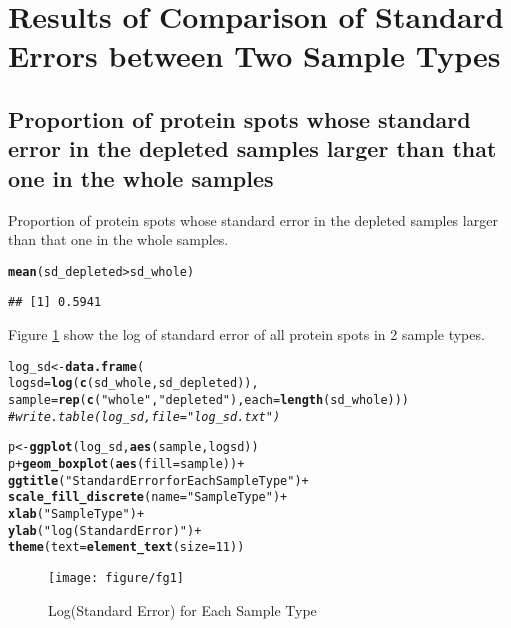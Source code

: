 \documentclass{article}\usepackage[]{graphicx}\usepackage[]{color}
\makeatletter
\def\maxwidth{ %
  \ifdim\Gin@nat@width>\linewidth
    \linewidth
  \else
    \Gin@nat@width
  \fi
}
\newcommand{\hlnum}[1]{\textcolor[rgb]{0.686,0.059,0.569}{#1}}%
\newcommand{\hlstr}[1]{\textcolor[rgb]{0.192,0.494,0.8}{#1}}%
\newcommand{\hlcom}[1]{\textcolor[rgb]{0.678,0.584,0.686}{\textit{#1}}}%
\newcommand{\hlopt}[1]{\textcolor[rgb]{0,0,0}{#1}}%
\newcommand{\hlstd}[1]{\textcolor[rgb]{0.345,0.345,0.345}{#1}}%
\newcommand{\hlkwb}[1]{\textcolor[rgb]{0.69,0.353,0.396}{#1}}%
\newcommand{\hlkwc}[1]{\textcolor[rgb]{0.333,0.667,0.333}{#1}}%
\newcommand{\hlkwd}[1]{\textcolor[rgb]{0.737,0.353,0.396}{\textbf{#1}}}%
\newenvironment{kframe}{%
 \def\at@end@of@kframe{}%
 \ifinner\ifhmode%
  \def\at@end@of@kframe{\end{minipage}}%
  \begin{minipage}{\columnwidth}%
 \fi\fi%
 \def\FrameCommand##1{\hskip\@totalleftmargin \hskip-\fboxsep
 \colorbox{shadecolor}{##1}\hskip-\fboxsep
     \hskip-\linewidth \hskip-\@totalleftmargin \hskip\columnwidth}%
 \MakeFramed {\advance\hsize-\width
   \@totalleftmargin\z@ \linewidth\hsize
   \@setminipage}}%
 {\par\unskip\endMakeFramed%
 \at@end@of@kframe}
\newenvironment{knitrout}{}{} %
\makeatother
\begin{document}
\section{Results of Comparison of Standard Errors between Two Sample Types}
\subsection{Proportion of protein spots whose standard error in the depleted samples larger than that one  in the whole samples}
Proportion of protein spots whose standard error in the depleted samples larger than that one  in the whole samples.
\begin{knitrout}
\color{fgcolor}\begin{kframe}
\begin{alltt}
\hlkwd{mean}\hlstd{(sd_depleted} \hlopt{>} \hlstd{sd_whole)}
\end{alltt}
\begin{verbatim}
## [1] 0.5941
\end{verbatim}
\end{kframe}
\end{knitrout}


Figure \ref{fig:fg1} show the log of standard error of all protein spots in 2 sample types.

\begin{knitrout}
\color{fgcolor}\begin{kframe}
\begin{alltt}
\hlstd{log_sd} \hlkwb{<-} \hlkwd{data.frame}\hlstd{(}
  \hlkwc{logsd} \hlstd{=} \hlkwd{log}\hlstd{(}\hlkwd{c}\hlstd{(sd_whole, sd_depleted)),}
  \hlkwc{sample} \hlstd{=} \hlkwd{rep}\hlstd{(}\hlkwd{c}\hlstd{(}\hlstr{"whole"}\hlstd{,} \hlstr{"depleted"}\hlstd{),} \hlkwc{each} \hlstd{=} \hlkwd{length}\hlstd{(sd_whole)))}
\hlcom{# write.table(log_sd, file = "log_sd.txt")}

\hlstd{p} \hlkwb{<-} \hlkwd{ggplot}\hlstd{(log_sd,} \hlkwd{aes}\hlstd{(sample, logsd))}
\hlstd{p} \hlopt{+} \hlkwd{geom_boxplot}\hlstd{(}\hlkwd{aes}\hlstd{(}\hlkwc{fill} \hlstd{= sample))} \hlopt{+}
  \hlkwd{ggtitle}\hlstd{(}\hlstr{"Standard Error for Each Sample Type"}\hlstd{)} \hlopt{+}
  \hlkwd{scale_fill_discrete}\hlstd{(}\hlkwc{name}\hlstd{=} \hlstr{"Sample Type"}\hlstd{)} \hlopt{+}
  \hlkwd{xlab}\hlstd{(}\hlstr{"Sample Type"}\hlstd{)} \hlopt{+}
  \hlkwd{ylab}\hlstd{(}\hlstr{"log(Standard Error)"}\hlstd{)} \hlopt{+}
  \hlkwd{theme}\hlstd{(}\hlkwc{text} \hlstd{=} \hlkwd{element_text}\hlstd{(}\hlkwc{size}\hlstd{=}\hlnum{11}\hlstd{))}
\end{alltt}
\end{kframe}\begin{figure}[h]

\texttt{[image: figure/fg1]} \caption[Log(Standard Error) for Each Sample Type]{Log(Standard Error) for Each Sample Type\label{fig:fg1}}
\end{figure}


\end{knitrout}
\end{document}
